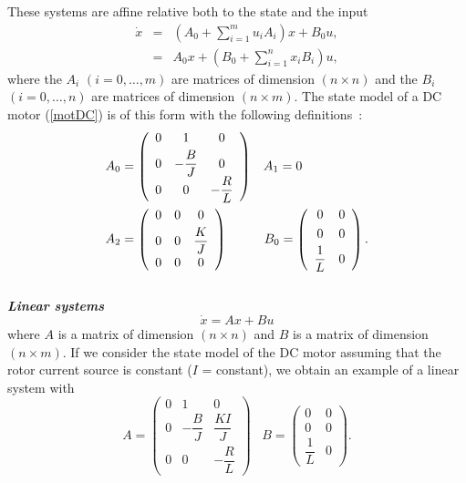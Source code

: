 These systems are affine relative both to the state and the input
\begin{eqnarray*}
\dot x &=& \left ( A_0 + \sum^m_{i=1} u_iA_i \right) x + B_0u, \\[0.3em]
&=& A_0x + (B_0+ \sum^n_{i=1} x_i B_i)u,
\end{eqnarray*}
where the $A_i$ $(i = 0, \ldots, m)$ are matrices of dimension $(n
\times n)$ and the $B_i$ $(i = 0, \ldots, n)$ are matrices of
dimension $(n \times m)$.  The state model of a DC motor
(\ref{motDC}) is of this form with the following definitions~:
\begin{equation*} \begin{split}
A_0 &= \left( \begin{array}{ccc}
0 & 1 & 0 \\[0.3em] 0 &-\dfrac{B}{J} & 0\\[0.3em]
0&0& -\dfrac{R}{L}
\end{array}
\right)\;\;\; A_1 = 0
\\
A_2 &= \left( \begin{array}{ccc}
0 & 0 & 0 \\[0.3em] 0 & 0 & \dfrac{K}{J} \\[0.5em]
0 & 0 & 0
\end{array}\right)\hspace*{10mm} B_0 = \left(\begin{array}{cc} 0 & 0 \\[0.3em] 0 & 0 \\[0.3em] \dfrac{1}{L}&0
\end{array} \right).
\end{split} \end{equation*}\\

\noindent \textbf{\textit{Linear systems}}
$$
\dot x = Ax +Bu
$$
where $A$ is a matrix of dimension $(n \times n)$ and $B$ is a matrix of dimension $(n \times m)$.  If we consider the state model of the DC motor assuming that the rotor current source is constant ($I$ = constant), we obtain an example of a linear system with
\begin{equation*}
A = \left( \begin{array}{ccc}
0 & 1 & 0 \\[0.3em] 0 &-\dfrac{B}{J} & \dfrac{KI}{J}\\[0.9em]
0&0& -\dfrac{R}{L}
\end{array}
\right)\;\;\; B = \left(\begin{array}{cc} 0 & 0 \\[0.3em] 0 & 0 \\[0.3em] \dfrac{1}{L}&0
\end{array} \right).
\end{equation*}
\vv

